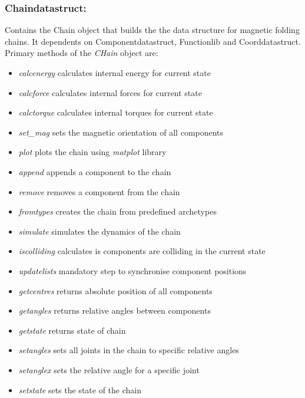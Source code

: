 \subsubsection{Chain\textunderscore data\textunderscore struct:} 
Contains the Chain object that builds the the data structure for magnetic folding chains. It dependents on Component\textunderscore data\textunderscore struct, Function\textunderscore lib and Coord\textunderscore data\textunderscore struct. Primary methods of the \textit{CHain} object are:
\begin{itemize}
    \item \textit{calc\textunderscore energy} calculates internal energy for current state
    \item \textit{calc\textunderscore force} calculates internal forces for current state
    \item \textit{calc\textunderscore torque} calculates internal torques for current state
    \item \textit{set_mag} sets the magnetic orientation of all components
    \item \textit{plot} plots the chain using \textit{matplot} library
    \item \textit{append} appends a component to the chain
    \item \textit{remove} removes a component from the chain
    \item \textit{from\textunderscore types} creates the chain from predefined archetypes
    \item \textit{simulate} simulates the dynamics of the chain
    \item \textit{is\textunderscore colliding} calculates is components are colliding in the current state
    \item \textit{update\textunderscore lists} mandatory step to synchronise component positions
    \item \textit{get\textunderscore centres} returns absolute position of all components
    \item \textit{get\textunderscore angles} returns relative angles between components
    \item \textit{get\textunderscore state} returns state of chain
    \item \textit{set\textunderscore angles} sets all joints in the chain to specific relative angles
    \item \textit{set\textunderscore anglex} sets the relative angle for a specific joint
    \item \textit{set\textunderscore state} sets the state of the chain
\end{itemize}
